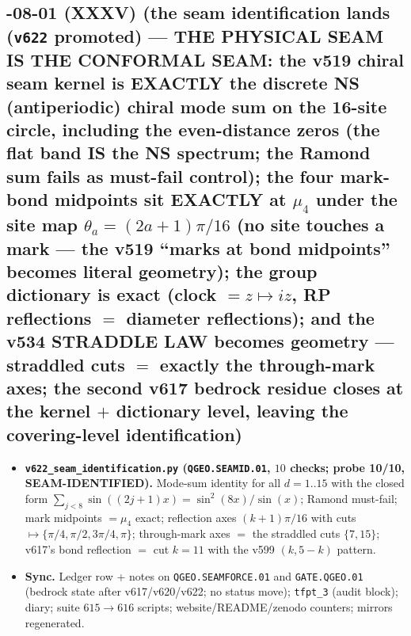 \subsection*{-08-01 (XXXV) (the seam identification lands (\texttt{v622} promoted) --- THE PHYSICAL SEAM IS THE CONFORMAL SEAM: the v519 chiral seam kernel is EXACTLY the discrete NS (antiperiodic) chiral mode sum on the 16-site circle, including the even-distance zeros (the flat band IS the NS spectrum; the Ramond sum fails as must-fail control); the four mark-bond midpoints sit EXACTLY at $\mu_4$ under the site map $\theta_a=(2a+1)\pi/16$ (no site touches a mark --- the v519 ``marks at bond midpoints'' becomes literal geometry); the group dictionary is exact (clock $=z\mapsto iz$, RP reflections $=$ diameter reflections); and the v534 STRADDLE LAW becomes geometry --- straddled cuts $=$ exactly the through-mark axes; the second v617 bedrock residue closes at the kernel $+$ dictionary level, leaving the covering-level identification)}
\begin{itemize}[leftmargin=1.5em]
\item \textbf{\texttt{v622\_seam\_identification.py} (\texttt{QGEO.SEAMID.01}, $10$ checks;
probe 10/10, SEAM-IDENTIFIED).} Mode-sum identity for all $d=1..15$ with the closed form
$\sum_{j<8}\sin((2j{+}1)x)=\sin^2(8x)/\sin(x)$; Ramond must-fail; mark midpoints $=\mu_4$
exact; reflection axes $(k{+}1)\pi/16$ with cuts $\mapsto\{\pi/4,\pi/2,3\pi/4,\pi\}$;
through-mark axes $=$ the straddled cuts $\{7,15\}$; v617's bond reflection $=$ cut
$k=11$ with the v599 $(k,5{-}k)$ pattern.
\item \textbf{Sync.} Ledger row + notes on \texttt{QGEO.SEAMFORCE.01} and
\texttt{GATE.QGEO.01} (bedrock state after v617/v620/v622; no status move);
\texttt{tfpt\_3} (audit block); diary; suite $615\to616$ scripts; website/README/zenodo
counters; mirrors regenerated.
\end{itemize}

